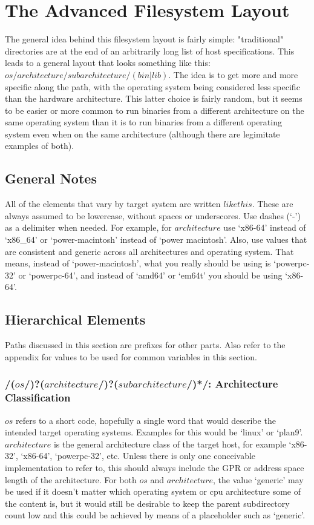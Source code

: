 \documentclass[a4paper,twoside,titlepage]{article}
\begin{document}
\newpage

\section{The Advanced Filesystem Layout}
The general idea behind this filesystem layout is fairly simple: "traditional"
directories are at the end of an arbitrarily long list of host specifications.
This leads to a general layout that looks something like this:
$os/architecture/subarchitecture/(bin|lib)$. The idea is to get more and more
specific along the path, with the operating system being considered less
specific than the hardware architecture. This latter choice is fairly random,
but it seems to be easier or more common to run binaries from a different
architecture on the same operating system than it is to run binaries from a
different operating system even when on the same architecture (although there
are legimitate examples of both).

\subsection{General Notes}
All of the elements that vary by target system are written $like this$. These
are always assumed to be lowercase, without spaces or underscores. Use dashes
(`-') as a delimiter when needed. For example, for $architecture$ use `x86-64'
instead of `x86\_64' or `power-macintosh' instead of `power macintosh'. Also,
use values that are consistent and generic across all architectures and
operating system. That means, instead of `power-macintosh', what you really
should be using is `powerpc-32' or `powerpc-64', and instead of `amd64' or
`em64t' you should be using `x86-64'.

\subsection{Hierarchical Elements}
Paths discussed in this section are prefixes for other parts. Also refer to the
appendix for values to be used for common variables in this section.

\subsubsection{/($os$/)?($architecture$/)?($subarchitecture$/)*/: Architecture
Classification}
$os$ refers to a short code, hopefully a single word that would describe the
intended target operating systems. Examples for this would be `linux' or
`plan9'. $architecture$ is the general architecture class of the target host,
for example `x86-32', `x86-64', `powerpc-32', etc. Unless there is only one
conceivable implementation to refer to, this should always include the GPR or
address space length of the architecture. For both $os$ and $architecture$, the
value `generic' may be used if it doesn't matter which operating system or cpu
architecture some of the content is, but it would still be desirable to keep the
parent subdirectory count low and this could be achieved by means of a
placeholder such as `generic'.
\end{document}
